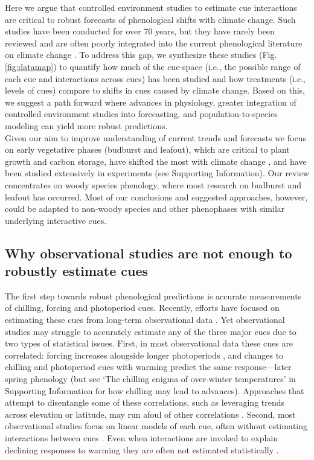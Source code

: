 \documentclass[11pt,letter]{article}
\newcommand{\R}[1]{\label{#1}\linelabel{#1}}
\begin{document}
Here we argue that controlled environment  studies to estimate cue interactions are critical to robust forecasts of phenological shifts with climate change. Such studies have been conducted for over 70 years, but they have rarely been reviewed and are often poorly integrated into the current phenological literature on climate change \citep[e.g.,][]{fu2015,richardson2018}. To address this gap, we synthesize these studies (Fig. \ref{fig:datamap}) to quantify how much of the cue-space (i.e., the possible range of each cue and interactions across cues) has been studied and how treatments (i.e., levels of cues) compare to shifts in cues caused by climate change. Based on this, we suggest a path forward where advances in physiology, greater integration of controlled environment studies into  forecasting, and \R{molecpop}population-to-species modeling can yield more robust predictions.\\ 

Given our aim to improve understanding of current trends and forecasts we focus on early vegetative phases (budburst and leafout), which are critical to plant growth and carbon storage, have shifted the most with climate change \citep{Cleland:2007or}, and have been studied extensively in experiments (see Supporting Information). Our review concentrates on woody species phenology, where most research on budburst and leafout has occurred. Most of our conclusions and suggested approaches, however, could be adapted to non-woody species and other phenophases with similar underlying interactive cues. 

\subsection{Why observational studies are not enough to robustly estimate cues}
The first step towards robust phenological predictions is accurate measurements of chilling, forcing and photoperiod cues. Recently, efforts have focused on estimating these cues from long-term observational data \citep[e.g.,][]{lued2013diff}. Yet observational studies may struggle to accurately estimate any of the three major cues due to two types of statistical issues. First, in most observational data these cues are correlated: forcing increases alongside longer photoperiods \citep{sarahailene2020}, and changes to chilling and photoperiod cues with warming predict the same response---later spring phenology \R{addreftochillsupp}(but see `The chilling enigma of over-winter temperatures' in Supporting Information for how chilling may lead to advances). Approaches that attempt to disentangle some of these correlations, such as leveraging trends across elevation or latitude, may run afoul of other correlations \citep[][]{tansey2017}. Second, most observational studies focus on linear models of each cue, often without \R{smtweakstat1}estimating interactions between cues \citep{visser2001,polgar2014}. Even when interactions are invoked to explain declining responses to warming they are often not estimated \R{smtweakstat2}statistically \citep[e.g.,][]{fu2015}.\\
\end{document}

